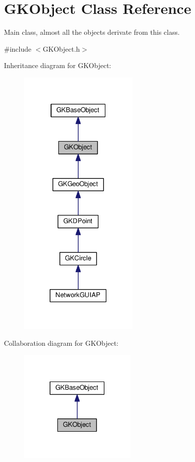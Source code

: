 \hypertarget{classGKObject}{}\section{G\+K\+Object Class Reference}
\label{classGKObject}


Main class, almost all the objects derivate from this class.  




{\ttfamily \#include $<$G\+K\+Object.\+h$>$}



Inheritance diagram for G\+K\+Object\+:
\nopagebreak
\begin{figure}[H]
\begin{center}
\leavevmode
\includegraphics[width=165pt]{classGKObject__inherit__graph}
\end{center}
\end{figure}


Collaboration diagram for G\+K\+Object\+:
\nopagebreak
\begin{figure}[H]
\begin{center}
\leavevmode
\includegraphics[width=162pt]{classGKObject__coll__graph}
\end{center}
\end{figure}
